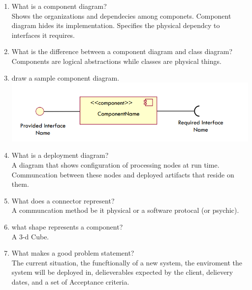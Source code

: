 \documentclass[10pt]{article}
\begin{document}
\begin{enumerate}
      \item What is a component diagram?\\
            Shows the organizations and dependecies among componets. Component diagram hides its implementation. Specifies the physical dependcy to interfaces it requires.\\

      \item What is the difference between a component diagram and class diagram?\\
            Components are logical abstractions while classes are physical things. \\

      \item draw a sample component diagram.\\
            \includegraphics*[scale=.5]{samplecomp.png}


      \item What is a deployment diagram?\\
            A diagram that shows configuration of processing nodes at run time. Communcation between these nodes and deployed artifacts that reside on them.\\

      \item What does a connector represent?\\
            A communcation method be it physical or a software protocal (or psychic).
            \\


      \item what shape represents a component?\\
            A 3-d Cube.\\

      \item What makes a good problem statement?\\
            The current situation, the funcftionally of a new system, the enviroment the system will be deployed in, delieverables expected by the client, delievery dates, and a set of Acceptance criteria.\\


\end{enumerate}
\end{document}
